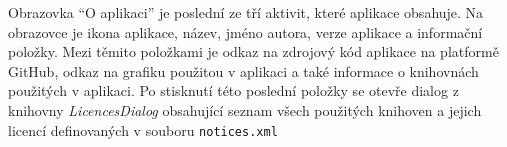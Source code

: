 \documentclass[../TakeYourPill.tex]{subfiles}
\begin{document}
Obrazovka \enquote{O aplikaci} je poslední ze tří aktivit, které aplikace obsahuje. Na obrazovce je ikona aplikace, název, jméno autora, verze aplikace a informační položky. Mezi těmito položkami je odkaz na zdrojový kód aplikace na platformě GitHub, odkaz na grafiku použitou v aplikaci a také informace o knihovnách použitých v aplikaci. Po stisknutí této poslední položky se otevře dialog z knihovny \textit{LicencesDialog} \cite{licences} obsahující seznam všech použitých knihoven a jejich licencí definovaných v souboru \texttt{notices.xml}
\end{document}
